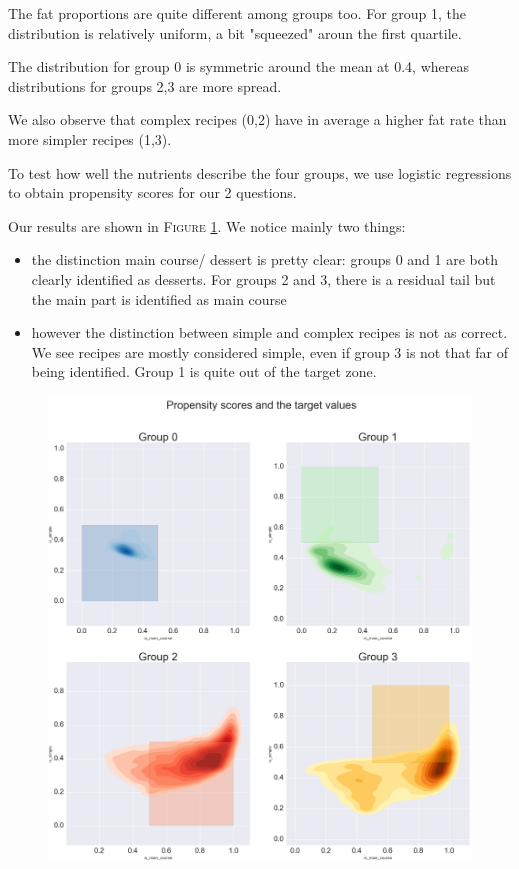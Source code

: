 \documentclass[11pt]{article}
\begin{document}
The fat proportions are quite different among groups too. For group 1, the distribution is relatively uniform, a bit "squeezed" aroun the first quartile.

The distribution for group 0 is symmetric around the mean at 0.4, whereas distributions for groups 2,3 are more spread.

We also observe that complex recipes (0,2) have in average a higher fat rate than more simpler recipes (1,3).


To test how well the nutrients describe the four groups, we use logistic regressions to obtain propensity scores for our 2 questions.

Our results are shown in \textsc{Figure} \ref{fig:end}. We notice mainly two things:
\begin{itemize}
\item the distinction main course/ dessert is pretty clear: groups 0 and 1 are both clearly identified as desserts. For groups 2 and 3, there is a residual tail but the main part is identified as main course
\item however the distinction between simple and complex recipes is not as correct. We see recipes are mostly considered simple, even if group 3 is not that far of being identified. Group 1 is quite out of the target zone.
\end{itemize}
\begin{figure}
	\captionsetup{justification=raggedright,singlelinecheck=false}
	\includegraphics[width=\textwidth]{../propensity-r.png}
	\caption{}
	\label{fig:end}
\end{figure}
\end{document}
